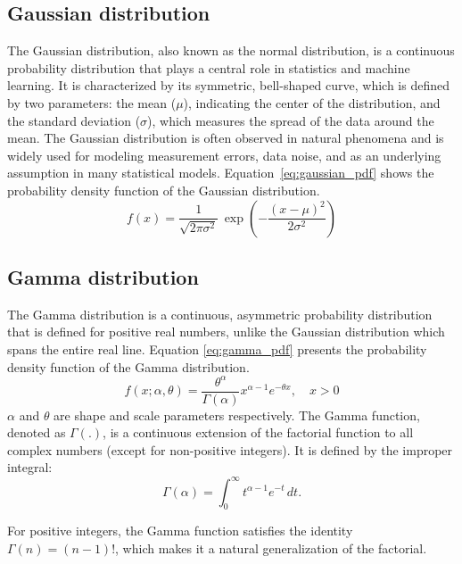 \documentclass[12pt,a4paper]{article}
\begin{document}
	\subsection{Gaussian distribution}
	The Gaussian distribution, also known as the normal distribution, is a continuous probability distribution that plays a central role in statistics and machine learning. It is characterized by its symmetric, bell-shaped curve, which is defined by two parameters: the mean ($\mu$), indicating the center of the distribution, and the standard deviation ($\sigma$), which measures the spread of the data around the mean. The Gaussian distribution is often observed in natural phenomena and is widely used for modeling measurement errors, data noise, and as an underlying assumption in many statistical models. Equation~\ref{eq:gaussian_pdf} shows the probability density function of the Gaussian distribution.
	\begin{equation}
		f(x) = \frac{1}{\sqrt{2\pi\sigma^2}} \, \exp\left( -\frac{(x - \mu)^2}{2\sigma^2} \right)
		\label{eq:gaussian_pdf}
	\end{equation} 
	\subsection{Gamma distribution} \label{h:Gamma distribution}
	The Gamma distribution is a continuous, asymmetric probability distribution that is defined for positive real numbers, unlike the Gaussian distribution which spans the entire real line. Equation \ref{eq:gamma_pdf} presents the probability density function of the Gamma distribution.
	\begin{equation}
		f(x; \alpha, \theta) = \frac{\theta^\alpha}{\Gamma(\alpha)} x^{\alpha - 1} e^{-\theta x}, \quad x > 0
		\label{eq:gamma_pdf}
	\end{equation}
	$\alpha$ and $\theta$ are shape and scale parameters respectively. The Gamma function, denoted as $\Gamma(.)$, is a continuous extension of the factorial function to all complex numbers (except for non-positive integers). It is defined by the improper integral:
	\begin{equation}
		\Gamma(\alpha) = \int_0^{\infty} t^{\alpha - 1} e^{-t} \, dt.
		\label{eq:gamma_function}
	\end{equation}
	
	For positive integers, the Gamma function satisfies the identity $\Gamma(n) = (n - 1)!$, which makes it a natural generalization of the factorial. 
	
\end{document}
